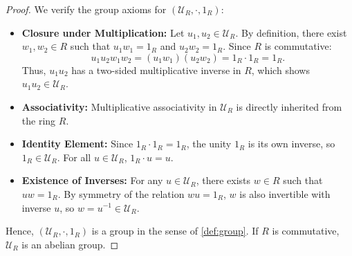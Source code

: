 \begin{content}

\begin{proof}
We verify the group axioms for $(\mathcal{U}_R, \cdot, 1_R)$:
\begin{itemize}
    \item \textbf{Closure under Multiplication:} Let $u_1, u_2 \in \mathcal{U}_R$. By definition, there exist $w_1, w_2 \in R$ such that $u_1 w_1 = 1_R$ and $u_2 w_2 = 1_R$. Since $R$ is commutative:
    \[
    u_1 u_2 w_1 w_2 = (u_1 w_1)(u_2 w_2) = 1_R \cdot 1_R = 1_R.
    \]
    Thus, $u_1 u_2$ has a two-sided multiplicative inverse in $R$, which shows $u_1 u_2 \in \mathcal{U}_R$.
    \item \textbf{Associativity:} Multiplicative associativity in $\mathcal{U}_R$ is directly inherited from the ring $R$.
    \item \textbf{Identity Element:} Since $1_R \cdot 1_R = 1_R$, the unity $1_R$ is its own inverse, so $1_R \in \mathcal{U}_R$. For all $u \in \mathcal{U}_R$, $1_R \cdot u = u$.
    \item \textbf{Existence of Inverses:} For any $u \in \mathcal{U}_R$, there exists $w \in R$ such that $u w = 1_R$. By symmetry of the relation $w u = 1_R$, $w$ is also invertible with inverse $u$, so $w = u^{-1} \in \mathcal{U}_R$.
\end{itemize}
Hence, $(\mathcal{U}_R, \cdot, 1_R)$ is a group in the sense of \cref{def:group}. If $R$ is commutative, $\mathcal{U}_R$ is an abelian group.
\end{proof}
\end{content}

\begin{hidden}
\end{hidden}

